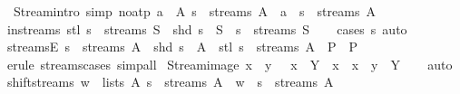 \begin{isabellebody}
\isanewline
\ \ Stream{\isacharbrackleft}intro{\isacharbang}{\isacharcomma}\ simp{\isacharcomma}\ no{\isacharunderscore}atp{\isacharbrackright}{\isacharcolon}\ {\isachardoublequoteopen}{\isasymlbrakk}a\ {\isasymin}\ A{\isacharsemicolon}\ s\ {\isasymin}\ streams\ A{\isasymrbrakk}\ {\isasymLongrightarrow}\ a\ {\isacharhash}{\isacharhash}\ s\ {\isasymin}\ streams\ A{\isachardoublequoteclose}\isanewline
\isanewline
{}\isamarkupfalse%
\isanewline
\isanewline
{}\isamarkupfalse%
\ in{\isacharunderscore}streams{\isacharcolon}\ {\isachardoublequoteopen}stl\ s\ {\isasymin}\ streams\ S\ {\isasymLongrightarrow}\ shd\ s\ {\isasymin}\ S\ {\isasymLongrightarrow}\ s\ {\isasymin}\ streams\ S{\isachardoublequoteclose}\isanewline
%
\isadelimproof
\ \ %
\endisadelimproof
%
\isatagproof
{}\isamarkupfalse%
\ {\isacharparenleft}cases\ s{\isacharparenright}\ auto%
\endisatagproof
{\isafoldproof}%
%
\isadelimproof
\isanewline
%
\endisadelimproof
\isanewline
{}\isamarkupfalse%
\ streamsE{\isacharcolon}\ {\isachardoublequoteopen}s\ {\isasymin}\ streams\ A\ {\isasymLongrightarrow}\ {\isacharparenleft}shd\ s\ {\isasymin}\ A\ {\isasymLongrightarrow}\ stl\ s\ {\isasymin}\ streams\ A\ {\isasymLongrightarrow}\ P{\isacharparenright}\ {\isasymLongrightarrow}\ P{\isachardoublequoteclose}\isanewline
%
\isadelimproof
\ \ %
\endisadelimproof
%
\isatagproof
{}\isamarkupfalse%
\ {\isacharparenleft}erule\ streams{\isachardot}cases{\isacharparenright}\ simp{\isacharunderscore}all%
\endisatagproof
{\isafoldproof}%
%
\isadelimproof
\isanewline
%
\endisadelimproof
\isanewline
{}\isamarkupfalse%
\ Stream{\isacharunderscore}image{\isacharcolon}\ {\isachardoublequoteopen}x\ {\isacharhash}{\isacharhash}\ y\ {\isasymin}\ {\isacharparenleft}{\isacharparenleft}{\isacharhash}{\isacharhash}{\isacharparenright}\ x{\isacharprime}{\isacharparenright}\ {\isacharbackquote}\ Y\ {\isasymlongleftrightarrow}\ x\ {\isacharequal}\ x{\isacharprime}\ {\isasymand}\ y\ {\isasymin}\ Y{\isachardoublequoteclose}\isanewline
%
\isadelimproof
\ \ %
\endisadelimproof
%
\isatagproof
{}\isamarkupfalse%
\ auto%
\endisatagproof
{\isafoldproof}%
%
\isadelimproof
\isanewline
%
\endisadelimproof
\isanewline
{}\isamarkupfalse%
\ shift{\isacharunderscore}streams{\isacharcolon}\ {\isachardoublequoteopen}{\isasymlbrakk}w\ {\isasymin}\ lists\ A{\isacharsemicolon}\ s\ {\isasymin}\ streams\ A{\isasymrbrakk}\ {\isasymLongrightarrow}\ w\ {\isacharat}{\isacharminus}\ s\ {\isasymin}\ streams\ A{\isachardoublequoteclose}\isanewline

\end{isabellebody}
